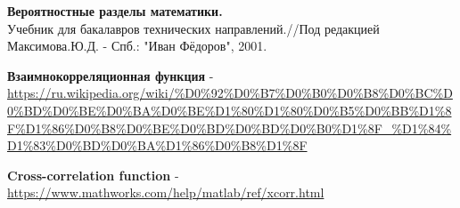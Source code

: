 \documentclass[12pt]{article}
\begin{document}
\begin{thebibliography}{}
    \textbf{Вероятностные разделы математики.} \\
    Учебник для бакалавров технических направлений.//Под редакцией Максимова.Ю.Д. - Спб.: "Иван Фёдоров", 2001.
    
    \textbf{Взаимнокорреляционная функция} - 
    \url{https://ru.wikipedia.org/wiki/%D0%92%D0%B7%D0%B0%D0%B8%D0%BC%D0%BD%D0%BE%D0%BA%D0%BE%D1%80%D1%80%D0%B5%D0%BB%D1%8F%D1%86%D0%B8%D0%BE%D0%BD%D0%BD%D0%B0%D1%8F_%D1%84%D1%83%D0%BD%D0%BA%D1%86%D0%B8%D1%8F}
    
    \textbf{Cross-correlation function} - 
	\url{https://www.mathworks.com/help/matlab/ref/xcorr.html}    
      
\end{thebibliography}
\end{document}

